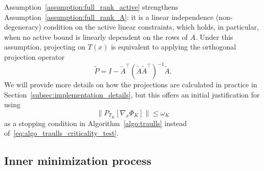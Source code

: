 \documentclass{article}
\numberwithin{equation}{section}
\newcommand{\proj}[2]{P_{#1} \left[ {#2} \right]} %
\theoremstyle{plain}
\begin{document}
	Assumption~\ref{assumption:full_rank_active} strengthens Assumption~\ref{assumption:full_rank_A}: it is a linear independence (non-degeneracy) condition on the active linear constraints, which holds, in particular, when no active bound is linearly dependent on the rows of $A$. Under this assumption, projecting on $T(x)$ is equivalent to applying the orthogonal projection operator
	\begin{equation}\label{eq:minor_subpb_projector}
		\tilde{P} = I - \tilde{A}^\top\left(\tilde{A}\tilde{A}^\top\right)^{-1}\tilde{A}.
	\end{equation}
	We will provide more details on how the projections are calculated in practice in Section~\ref{subsec:implementation_details}, but this offers an initial justification for using
	\begin{equation}\label{eq:criticality_cond_reduced_grad}
		\|\proj{T_K}{\nabla_x\Phi_K}\| \le \omega_K
	\end{equation}
	as a stopping condition in Algorithm~\ref{algo:traulls} instead of~\eqref{eq:algo_traulls_criticality_test}.
	
	\subsection{Inner minimization process}\label{subsec:inner_iteration}
	
\end{document}
